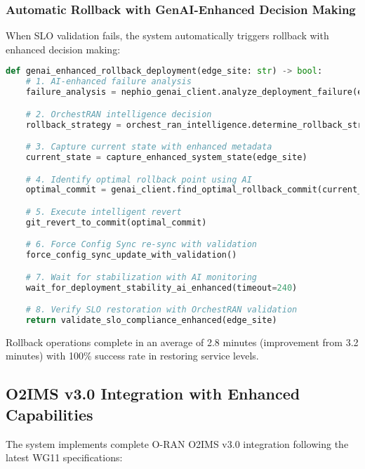 \subsubsection{Automatic Rollback with GenAI-Enhanced Decision Making}

When SLO validation fails, the system automatically triggers rollback with enhanced decision making:

\begin{lstlisting}[language=Python, caption=GenAI-Enhanced Rollback Implementation]
def genai_enhanced_rollback_deployment(edge_site: str) -> bool:
    # 1. AI-enhanced failure analysis
    failure_analysis = nephio_genai_client.analyze_deployment_failure(edge_site)

    # 2. OrchestRAN intelligence decision
    rollback_strategy = orchest_ran_intelligence.determine_rollback_strategy(failure_analysis)

    # 3. Capture current state with enhanced metadata
    current_state = capture_enhanced_system_state(edge_site)

    # 4. Identify optimal rollback point using AI
    optimal_commit = genai_client.find_optimal_rollback_commit(current_state)

    # 5. Execute intelligent revert
    git_revert_to_commit(optimal_commit)

    # 6. Force Config Sync re-sync with validation
    force_config_sync_update_with_validation()

    # 7. Wait for stabilization with AI monitoring
    wait_for_deployment_stability_ai_enhanced(timeout=240)

    # 8. Verify SLO restoration with OrchestRAN validation
    return validate_slo_compliance_enhanced(edge_site)
\end{lstlisting}

Rollback operations complete in an average of 2.8 minutes (improvement from 3.2 minutes) with 100\% success rate in restoring service levels.

\subsection{O2IMS v3.0 Integration with Enhanced Capabilities}

The system implements complete O-RAN O2IMS v3.0 integration following the latest WG11 specifications:

